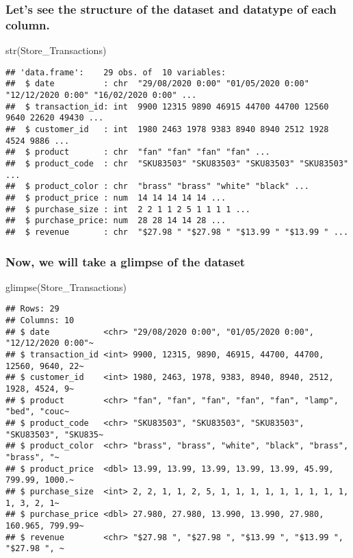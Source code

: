 \documentclass[
]{article}
\newenvironment{Shaded}{\begin{snugshade}}{\end{snugshade}}
\newcommand{\FunctionTok}[1]{\textcolor[rgb]{0.00,0.00,0.00}{#1}}
\newcommand{\NormalTok}[1]{#1}
\begin{document}
\hypertarget{lets-see-the-structure-of-the-dataset-and-datatype-of-each-column.}{%
\subsubsection{Let's see the structure of the dataset and datatype of
each
column.}\label{lets-see-the-structure-of-the-dataset-and-datatype-of-each-column.}}

\begin{Shaded}
\begin{Highlighting}[]
\FunctionTok{str}\NormalTok{(Store\_Transactions)}
\end{Highlighting}
\end{Shaded}

\begin{verbatim}
## 'data.frame':    29 obs. of  10 variables:
##  $ date          : chr  "29/08/2020 0:00" "01/05/2020 0:00" "12/12/2020 0:00" "16/02/2020 0:00" ...
##  $ transaction_id: int  9900 12315 9890 46915 44700 44700 12560 9640 22620 49430 ...
##  $ customer_id   : int  1980 2463 1978 9383 8940 8940 2512 1928 4524 9886 ...
##  $ product       : chr  "fan" "fan" "fan" "fan" ...
##  $ product_code  : chr  "SKU83503" "SKU83503" "SKU83503" "SKU83503" ...
##  $ product_color : chr  "brass" "brass" "white" "black" ...
##  $ product_price : num  14 14 14 14 14 ...
##  $ purchase_size : int  2 2 1 1 2 5 1 1 1 1 ...
##  $ purchase_price: num  28 28 14 14 28 ...
##  $ revenue       : chr  "$27.98 " "$27.98 " "$13.99 " "$13.99 " ...
\end{verbatim}

\hypertarget{now-we-will-take-a-glimpse-of-the-dataset}{%
\subsubsection{Now, we will take a glimpse of the
dataset}\label{now-we-will-take-a-glimpse-of-the-dataset}}

\begin{Shaded}
\begin{Highlighting}[]
\FunctionTok{glimpse}\NormalTok{(Store\_Transactions)}
\end{Highlighting}
\end{Shaded}

\begin{verbatim}
## Rows: 29
## Columns: 10
## $ date           <chr> "29/08/2020 0:00", "01/05/2020 0:00", "12/12/2020 0:00"~
## $ transaction_id <int> 9900, 12315, 9890, 46915, 44700, 44700, 12560, 9640, 22~
## $ customer_id    <int> 1980, 2463, 1978, 9383, 8940, 8940, 2512, 1928, 4524, 9~
## $ product        <chr> "fan", "fan", "fan", "fan", "fan", "lamp", "bed", "couc~
## $ product_code   <chr> "SKU83503", "SKU83503", "SKU83503", "SKU83503", "SKU835~
## $ product_color  <chr> "brass", "brass", "white", "black", "brass", "brass", "~
## $ product_price  <dbl> 13.99, 13.99, 13.99, 13.99, 13.99, 45.99, 799.99, 1000.~
## $ purchase_size  <int> 2, 2, 1, 1, 2, 5, 1, 1, 1, 1, 1, 1, 1, 1, 1, 1, 3, 2, 1~
## $ purchase_price <dbl> 27.980, 27.980, 13.990, 13.990, 27.980, 160.965, 799.99~
## $ revenue        <chr> "$27.98 ", "$27.98 ", "$13.99 ", "$13.99 ", "$27.98 ", ~
\end{verbatim}
\end{document}
